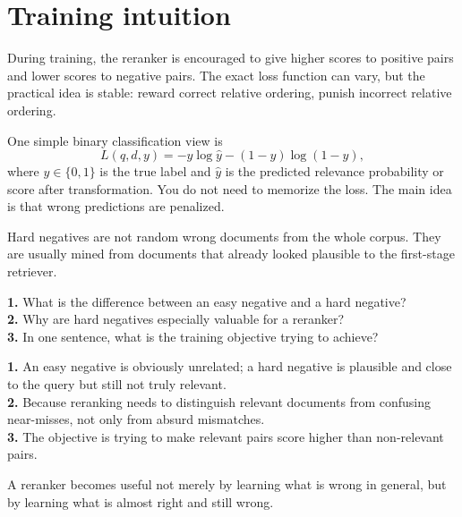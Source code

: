 \documentclass[11pt,oneside]{report}
\begin{document}
\section*{Training intuition}
During training, the reranker is encouraged to give higher scores to positive pairs and lower scores to negative pairs. The exact loss function can vary, but the practical idea is stable: reward correct relative ordering, punish incorrect relative ordering.

\begin{formulabox}
One simple binary classification view is
\[
L(q,d,y)=-y\log \hat{y}-(1-y)\log(1-\hat{y}),
\]
where $y\in\{0,1\}$ is the true label and $\hat{y}$ is the predicted relevance probability or score after transformation. You do not need to memorize the loss. The main idea is that wrong predictions are penalized.
\end{formulabox}

\begin{warningbox}
Hard negatives are not random wrong documents from the whole corpus. They are usually mined from documents that already looked plausible to the first-stage retriever.
\end{warningbox}

\begin{selfcheckbox}
\textbf{1.} What is the difference between an easy negative and a hard negative?\\
\textbf{2.} Why are hard negatives especially valuable for a reranker?\\
\textbf{3.} In one sentence, what is the training objective trying to achieve?
\end{selfcheckbox}

\begin{answerbox}
\textbf{1.} An easy negative is obviously unrelated; a hard negative is plausible and close to the query but still not truly relevant.\\
\textbf{2.} Because reranking needs to distinguish relevant documents from confusing near-misses, not only from absurd mismatches.\\
\textbf{3.} The objective is trying to make relevant pairs score higher than non-relevant pairs.
\end{answerbox}

\begin{rememberbox}
A reranker becomes useful not merely by learning what is wrong in general, but by learning what is almost right and still wrong.
\end{rememberbox}
\end{document}
